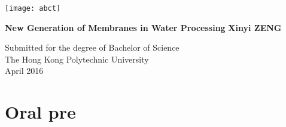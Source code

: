 \documentclass[a4paper,12pt]{report}
\begin{document}




\thispagestyle{empty}
\begin{flushright}
\texttt{[image: abct]}
\end{flushright}	
\vskip40mm
\begin{center}
\huge\textbf{New Generation of Membranes in Water Processing}
\vskip2mm
\LARGE\textit{ }
\vskip5mm
\Large\textbf{Xinyi ZENG}
\normalsize
\end{center}
\vfill
\begin{flushleft}
\large
Submitted for the degree of Bachelor of Science \\
The Hong Kong Polytechnic University	\\
April 2016
\end{flushleft}		


\newpage
{}
\tableofcontents
\listoftables
{}
{}
\listoffigures
{}
{}


\newpage
{}
\chapter{Oral pre}
 \citep{kor04}
 \citep{47hua}
 \citep{48lia}
\citep{46zhao}
 \citep{101kaz}
 \citep{32afang}
\citep{15fane}
 \citep{71nair}



\end{document}
